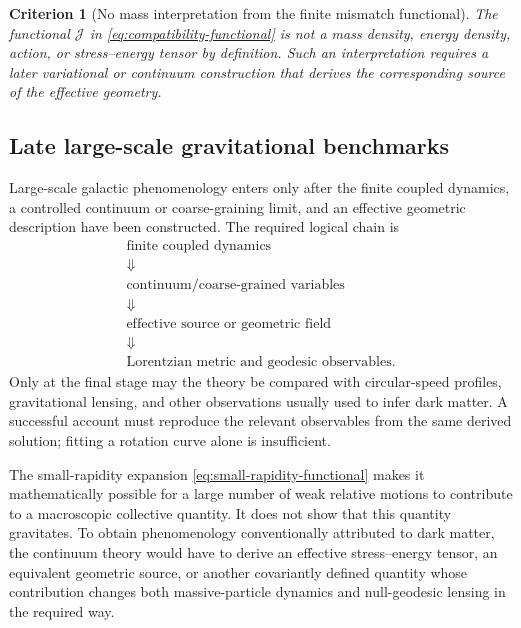 \documentclass[11pt,a4paper]{article}
\newtheorem{criterion}[definition]{Criterion}
\theoremstyle{remark}
\begin{document}
\begin{criterion}[No mass interpretation from the finite mismatch functional]
The functional \(\mathcal J\) in \eqref{eq:compatibility-functional} is not a mass density, energy density, action, or stress--energy tensor by definition.  Such an interpretation requires a later variational or continuum construction that derives the corresponding source of the effective geometry.
\end{criterion}

\subsection{Late large-scale gravitational benchmarks}

Large-scale galactic phenomenology enters only after the finite coupled dynamics, a controlled continuum or coarse-graining limit, and an effective geometric description have been constructed.  The required logical chain is
\[
\begin{gathered}
\text{finite coupled dynamics}\\
\Downarrow\\
\text{continuum/coarse-grained variables}\\
\Downarrow\\
\text{effective source or geometric field}\\
\Downarrow\\
\text{Lorentzian metric and geodesic observables}.
\end{gathered}
\]
Only at the final stage may the theory be compared with circular-speed profiles, gravitational lensing, and other observations usually used to infer dark matter.  A successful account must reproduce the relevant observables from the same derived solution; fitting a rotation curve alone is insufficient.

The small-rapidity expansion \eqref{eq:small-rapidity-functional} makes it mathematically possible for a large number of weak relative motions to contribute to a macroscopic collective quantity.  It does not show that this quantity gravitates.  To obtain phenomenology conventionally attributed to dark matter, the continuum theory would have to derive an effective stress--energy tensor, an equivalent geometric source, or another covariantly defined quantity whose contribution changes both massive-particle dynamics and null-geodesic lensing in the required way.
\end{document}
